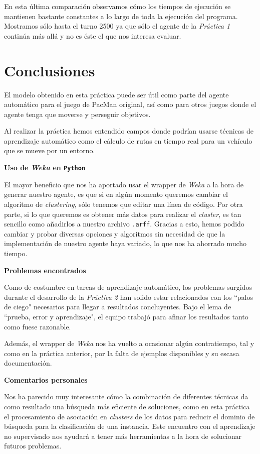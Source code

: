 \documentclass[12pt]{article}
\begin{document}
En esta última comparación observamos cómo los tiempos de ejecución se mantienen bastante constantes a lo largo de toda la ejecución del programa. Mostramos sólo hasta el turno 2500 ya que sólo el agente de la \textit{Práctica 1} continúa más allá y no es éste el que nos interesa evaluar.


\newpage
\section{Conclusiones}

El modelo obtenido en esta práctica puede ser útil como parte del agente automático para el juego de PacMan original, así como para otros juegos donde el agente tenga que moverse y perseguir objetivos.

Al realizar la práctica hemos entendido campos donde podrían usarse técnicas de aprendizaje automático como el cálculo de rutas en tiempo real para un vehículo que se mueve por un entorno.

\vspace{0.5cm}
\centerline{\textbf{Uso de \textit{Weka} en \texttt{Python}}}
\vspace{0.5cm}

El mayor beneficio que nos ha aportado usar el wrapper de \textit{Weka} a la hora de generar nuestro agente, es que si en algún momento queremos cambiar el algoritmo de \textit{clustering}, sólo tenemos que editar una línea de código. Por otra parte, si lo que queremos es obtener más datos para realizar el \textit{cluster}, es tan sencillo como añadirlos a nuestro archivo \texttt{.arff}. Gracias a esto, hemos podido cambiar y probar diversas opciones y algoritmos sin necesidad de que la implementación de nuestro agente haya variado, lo que nos ha ahorrado mucho tiempo.

\vspace{0.5cm}
\centerline{\textbf{Problemas encontrados}}
\vspace{0.5cm}

Como de costumbre en tareas de aprendizaje automático, los problemas surgidos durante el desarrollo de la \textit{Práctica 2} han solido estar relacionados con los ``palos de ciego" necesarios para llegar a resultados concluyentes. Bajo el lema de ``prueba, error y aprendizaje", el equipo trabajó para afinar los resultados tanto como fuese razonable.

Además, el wrapper de \textit{Weka} nos ha vuelto a ocasionar algún contratiempo, tal y como en la práctica anterior, por la falta de ejemplos disponibles y su escasa documentación.

\vspace{0.5cm}
\centerline{\textbf{Comentarios personales}}
\vspace{0.5cm}

Nos ha parecido muy interesante cómo la combinación de diferentes técnicas da como resultado una búsqueda más eficiente de soluciones, como en esta práctica el procesamiento de asociación en \textit{clusters} de los datos para reducir el dominio de búsqueda para la clasificación de una instancia. Este encuentro con el aprendizaje no supervisado nos ayudará a tener más herramientas a la hora de solucionar futuros problemas.
\end{document}
